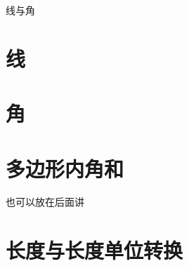 \setcounter{section}{0}


\begin{parchmentquote}
    线与角
\end{parchmentquote}






\section{线}
\section{角}
\section{多边形内角和}
也可以放在后面讲
\section{长度与长度单位转换}



\newpage